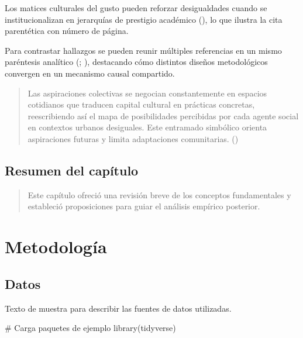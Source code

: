 \documentclass[
  spanish,
  a4paper,
  oneside]{scrbook}
\newenvironment{Shaded}{\begin{snugshade}}{\end{snugshade}}
\newcommand{\CommentTok}[1]{\textcolor[rgb]{0.37,0.37,0.37}{#1}}
\newcommand{\FunctionTok}[1]{\textcolor[rgb]{0.28,0.35,0.67}{#1}}
\newcommand{\NormalTok}[1]{\textcolor[rgb]{0.00,0.23,0.31}{#1}}
\begin{document}
Los matices culturales del gusto pueden reforzar desigualdades cuando se
institucionalizan en jerarquías de prestigio académico
(), lo que ilustra la
cita parentética con número de página.

Para contrastar hallazgos se pueden reunir múltiples referencias en un
mismo paréntesis analítico (; ), destacando
cómo distintos diseños metodológicos convergen en un mecanismo causal
compartido.

\begin{quote}
Las aspiraciones colectivas se negocian constantemente en espacios
cotidianos que traducen capital cultural en prácticas concretas,
reescribiendo así el mapa de posibilidades percibidas por cada agente
social en contextos urbanos desiguales. Este entramado simbólico orienta
aspiraciones futuras y limita adaptaciones comunitarias.
()
\end{quote}

\section{Resumen del capítulo}\label{resumen-del-capuxedtulo}

\begin{quote}
Este capítulo ofreció una revisión breve de los conceptos fundamentales
y estableció proposiciones para guiar el análisis empírico posterior.
\end{quote}


\chapter{Metodología}\label{metodologuxeda}

\section{Datos}\label{datos}

Texto de muestra para describir las fuentes de datos utilizadas.

\begin{Shaded}
\begin{Highlighting}[]
\CommentTok{\# Carga paquetes de ejemplo}
\FunctionTok{library}\NormalTok{(tidyverse)}
\end{Highlighting}
\end{Shaded}
\end{document}
